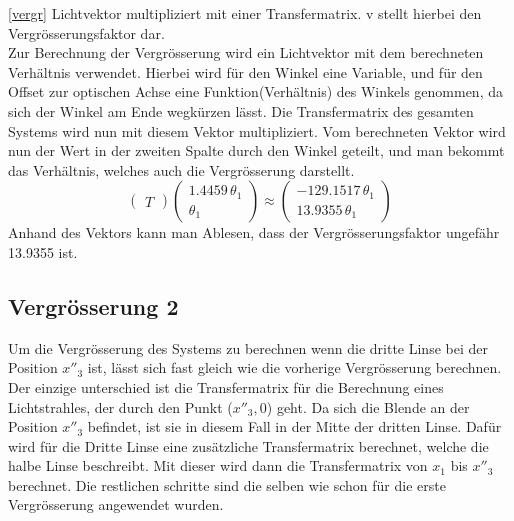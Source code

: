 \documentclass[11pt,twoside,a4paper]{article}
\begin{document}
	\ref{vergr} Lichtvektor multipliziert mit einer Transfermatrix. v stellt hierbei den Vergrösserungsfaktor dar.  \\
	Zur Berechnung der Vergrösserung wird ein Lichtvektor mit dem berechneten Verhältnis verwendet. Hierbei wird für den Winkel eine Variable, und für den Offset zur optischen Achse eine Funktion(Verhältnis) des Winkels genommen, da sich der Winkel am Ende wegkürzen lässt. Die Transfermatrix des gesamten Systems wird nun mit diesem Vektor multipliziert. Vom berechneten Vektor wird nun der Wert in der zweiten Spalte durch den Winkel geteilt, und man bekommt das Verhältnis, welches auch die Vergrösserung darstellt.
	\begin{equation}
	\begin{pmatrix}
	T
	\end{pmatrix}
	\begin{pmatrix}
	1.4459\,\theta_1 \\
	\theta_1 
	\end{pmatrix}
	\approx
	\begin{pmatrix}
	-129.1517\,\theta_1 \\
	13.9355\,\theta_1
	\end{pmatrix}
	\end{equation}
	Anhand des Vektors kann man Ablesen, dass der Vergrösserungsfaktor ungefähr 13.9355 ist.
	\subsection{Vergrösserung 2}
	Um die Vergrösserung des Systems zu berechnen wenn die dritte Linse bei der Position \(x''_{3}\) ist, lässt sich fast gleich wie die vorherige Vergrösserung berechnen. Der einzige unterschied ist die Transfermatrix für die Berechnung eines Lichtstrahles, der durch den Punkt (\(x''_{3},0\)) geht. Da sich die Blende an der Position \(x''_{3}\) befindet, ist sie in diesem Fall in der Mitte der dritten Linse. Dafür wird für die Dritte Linse eine zusätzliche Transfermatrix berechnet, welche die halbe Linse beschreibt. Mit dieser wird dann die Transfermatrix von \(x_{1}\) bis \(x''_{3}\) berechnet. Die restlichen schritte sind die selben wie schon für die erste Vergrösserung angewendet wurden.
\end{document}
